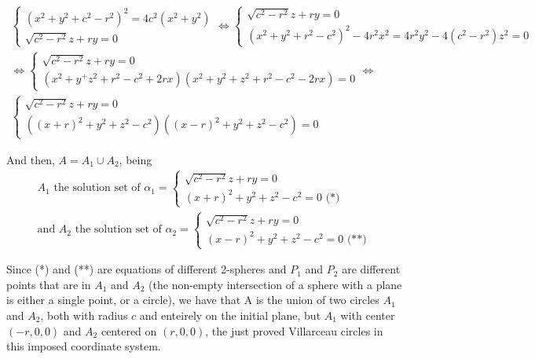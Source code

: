 \begin{gather*}
    \begin{cases}
        (x^2+y^2+c^2-r^2)^2 = 4c^2(x^2+y^2)\\
        \sqrt{c^2-r^2}z+ry=0
    \end{cases}
    \Leftrightarrow
    \begin{cases}
        \sqrt{c^2-r^2}z+ry=0\\
        (x^2+y^2+r^2-c^2)^2 - 4r^2x^2 = 4r^2y^2 - 4(c^2-r^2)z^2 = 0
    \end{cases}\\
    \Leftrightarrow
    \begin{cases}
        \sqrt{c^2-r^2}z+ry=0\\
        (x^2+y^+z^2+r^2-c^2+2rx)(x^2+y^2+z^2+r^2-c^2-2rx) = 0
    \end{cases}
    \Leftrightarrow\\
    \begin{cases}
        \sqrt{c^2-r^2}z+ry=0\\
        ((x+r)^2+y^2+z^2-c^2)((x-r)^2+y^2+z^2-c^2) = 0
    \end{cases}
\end{gather*}

And then, $A = A_1 \cup A_2$, being
\begin{gather*}
    A_1 \text{ the solution set of } \alpha_1 = 
    \begin{cases}
        \sqrt{c^2-r^2}z+ry=0\\
        (x+r)^2+y^2+z^2-c^2 = 0 \text{ (*)}
    \end{cases}\\
    \text{and } A_2 \text{ the solution set of } \alpha_2 = 
    \begin{cases}
        \sqrt{c^2-r^2}z+ry=0\\
        (x-r)^2+y^2+z^2-c^2 = 0 \text{ (**)}
    \end{cases}
\end{gather*}

Since (*) and (**) are equations of different 2-spheres and $P_1$ and $P_2$ are different points that are in $A_1$ and $A_2$ (the non-empty intersection of a sphere with a plane is either a single point, or a circle), we have that A is the union of two circles $A_1$ and $A_2$, both with radius $c$ and enteirely on the initial plane, but $A_1$ with center $(-r, 0, 0)$ and $A_2$ centered on $(r, 0, 0)$, the just proved Villarceau circles in this imposed coordinate system.
%
%
%
%
